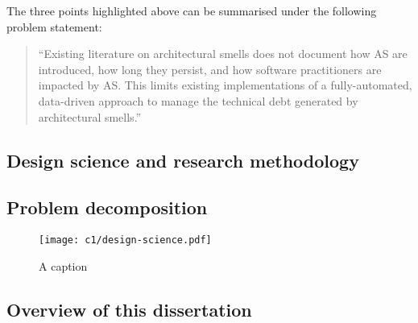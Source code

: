 The three points highlighted above can be summarised under the following problem statement:
\begin{quote}
    ``Existing literature on architectural smells does not document how AS are introduced, how long they persist, and how software practitioners are impacted by AS. 
    This limits existing implementations of a fully-automated, data-driven approach to manage the technical debt generated by architectural smells.''
\end{quote}

\subsection{Design science and research methodology}

\subsection{Problem decomposition}
\begin{figure}
    \centering
    \texttt{[image: c1/design-science.pdf]}
    \caption{A caption}\label{fig:problem-decomposition}
\end{figure}
\subsection{Overview of this dissertation}

